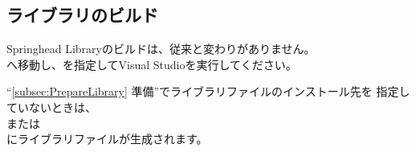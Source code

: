 \subsection{ライブラリのビルド}
\label{subsec:BuildLibrary}

\noindent
Springhead Libraryのビルドは、従来と変わりがありません。\\
\build へ移動し、を指定してVisual Studioを実行してください。

\medskip
``\ref{subsec:PrepareLibrary} 準備''でライブラリファイルのインストール先を
指定していないときは、\\
または\\
にライブラリファイルが生成されます。

